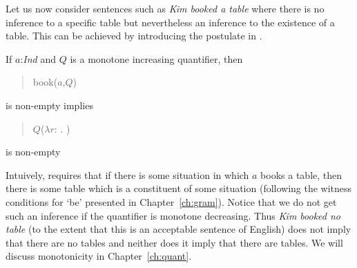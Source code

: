Let us now consider sentences such as \textit{Kim booked a table}
where there is no inference to a specific table but nevertheless an
inference to the existence of a table. This can be achieved by
introducing the postulate in \nexteg{}.
\begin{ex} 
If $a$:\textit{Ind} and $Q$ is a monotone increasing quantifier, then
\begin{quote}
book($a$,$Q$)
\end{quote} is non-empty
implies
\begin{quote}
$Q$($\lambda r$:
.  
  ) 
\end{quote}
is non-empty
\end{ex} 
Intuively, \preveg{} requires that if there is some situation in which
$a$ books a table, then there is some table which is a constituent of
some situation (following the witness conditions for `be' presented in
Chapter~\ref{ch:gram}).  Notice that we do not get such an inference
if the quantifier is monotone decreasing.  Thus \textit{Kim booked no
  table} (to the extent that this is an acceptable sentence of
English) does not imply that there are no tables and neither does it
imply that there are tables.  We will discuss monotonicity in
Chapter~\ref{ch:quant}.

